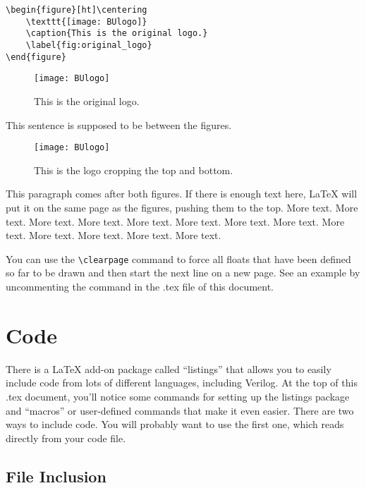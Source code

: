 \documentclass[11pt]{article}
\begin{document}
\begin{verbatim}
\begin{figure}[ht]\centering
    \texttt{[image: BUlogo]}
    \caption{This is the original logo.}
    \label{fig:original_logo}
\end{figure}
\end{verbatim}

\begin{figure}[ht]\centering
	\texttt{[image: BUlogo]}
	\caption{This is the original logo.}
	\label{fig:original_logo}			%
\end{figure}

This sentence is supposed to be between the figures.

\begin{figure}[ht]\centering
	\texttt{[image: BUlogo]}
	\caption{This is the logo cropping the top and bottom.}
	\label{fig:another_image}		%
\end{figure}

\clearpage

This paragraph comes after both figures. If there is enough text here, LaTeX will put it on the same page as the figures, pushing them to the top.  More text. More text. More text. More text. More text. More text. More text. More text. More text. More text. More text. More text. More text.

You can use the \verb|\clearpage| command to force all floats that have been defined so far to be drawn and then start the next line on a new page.  See an example by uncommenting the command in the .tex file of this document.


\section*{Code}
There is a LaTeX add-on package called ``listings'' that allows you to easily include code from lots of different languages, including Verilog.  At the top of this .tex document, you'll notice some commands for setting up the listings package and ``macros'' or user-defined commands that make it even easier.  There are two ways to include code.  You will probably want to use the first one, which reads directly from your code file.  

\subsection*{File Inclusion}
\end{document}

